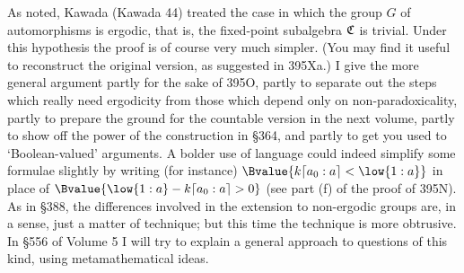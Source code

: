 {As noted, Kawada ({\smc Kawada 44}) treated the case in which the group
$G$ of automorphisms is ergodic, that is, the fixed-point subalgebra
$\frak C$ is trivial.   Under this hypothesis the proof is of course
very much
simpler.   (You may find it useful to reconstruct the original version,
as suggested in 395Xa.)   I give the more general argument partly for
the sake of 395O, partly to separate out the steps which really need
ergodicity from those which depend only on
non-paradoxicality, partly to prepare the ground for the countable
version in the next volume, partly to show off the power of the
construction in \S364, and
partly to get you used to `Boolean-valued' arguments.   A bolder use of
language could indeed simplify some formulae slightly by writing (for
instance) $\Bvalue{k\high{a_0:a}<\low{1:a}}$ in place of
$\Bvalue{\low{1:a}-k\high{a_0:a}>0}$ (see part (f) of the proof of
395N).   As in \S388, the differences involved in the extension to
non-ergodic groups are, in a sense, just a matter of
technique;  but this time the technique is more obtrusive.   In \S556 of
Volume 5 I will try to explain a general approach to questions of this
kind, using metamathematical ideas.
}%

\discrpage

